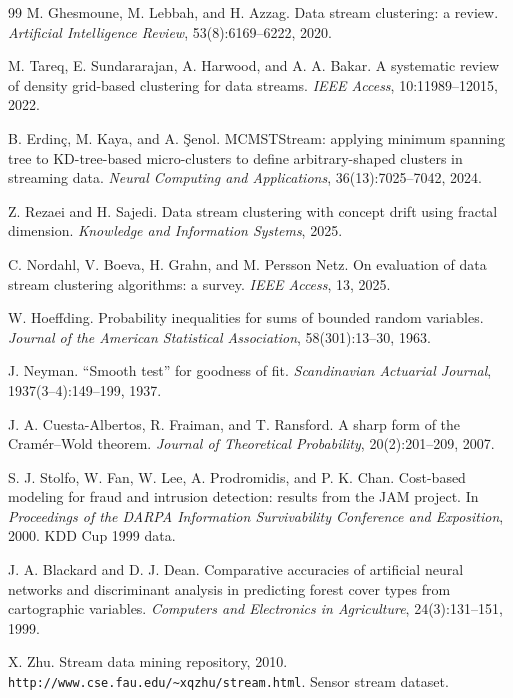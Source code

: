 \documentclass[11pt]{article}
\begin{document}
\begin{thebibliography}{99}
M. Ghesmoune, M. Lebbah, and H. Azzag.
Data stream clustering: a review.
\textit{Artificial Intelligence Review}, 53(8):6169--6222, 2020.

M. Tareq, E. Sundararajan, A. Harwood, and A. A. Bakar.
A systematic review of density grid-based clustering for data streams.
\textit{IEEE Access}, 10:11989--12015, 2022.

B. Erdin{\c{c}}, M. Kaya, and A. {\c{S}}enol.
MCMSTStream: applying minimum spanning tree to KD-tree-based micro-clusters to define arbitrary-shaped clusters in streaming data.
\textit{Neural Computing and Applications}, 36(13):7025--7042, 2024.

Z. Rezaei and H. Sajedi.
Data stream clustering with concept drift using fractal dimension.
\textit{Knowledge and Information Systems}, 2025.

C. Nordahl, V. Boeva, H. Grahn, and M. Persson Netz.
On evaluation of data stream clustering algorithms: a survey.
\textit{IEEE Access}, 13, 2025.

W. Hoeffding.
Probability inequalities for sums of bounded random variables.
\textit{Journal of the American Statistical Association}, 58(301):13--30, 1963.

J. Neyman.
``Smooth test'' for goodness of fit.
\textit{Scandinavian Actuarial Journal}, 1937(3--4):149--199, 1937.

J. A. Cuesta-Albertos, R. Fraiman, and T. Ransford.
A sharp form of the Cram\'er--Wold theorem.
\textit{Journal of Theoretical Probability}, 20(2):201--209, 2007.

S. J. Stolfo, W. Fan, W. Lee, A. Prodromidis, and P. K. Chan.
Cost-based modeling for fraud and intrusion detection: results from the JAM project.
In \textit{Proceedings of the DARPA Information Survivability Conference and Exposition}, 2000.
KDD Cup 1999 data.

J. A. Blackard and D. J. Dean.
Comparative accuracies of artificial neural networks and discriminant analysis in predicting forest cover types from cartographic variables.
\textit{Computers and Electronics in Agriculture}, 24(3):131--151, 1999.

X. Zhu.
Stream data mining repository, 2010.
\texttt{http://www.cse.fau.edu/\textasciitilde xqzhu/stream.html}. Sensor stream dataset.

\end{thebibliography}
\end{document}
